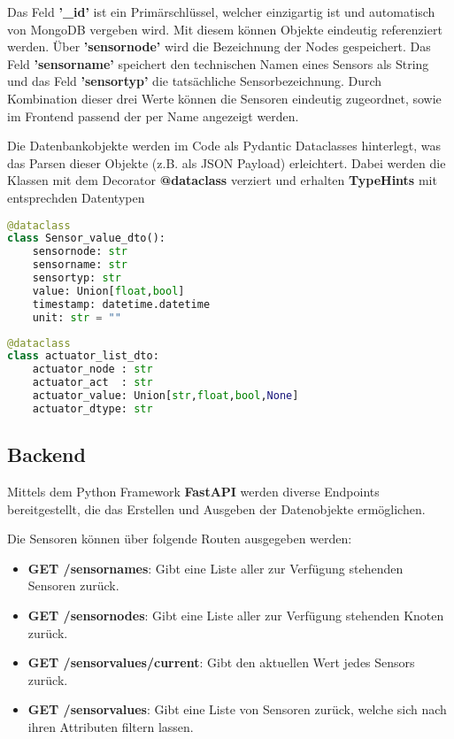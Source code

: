 Das Feld \textbf{'\_id'} ist ein Primärschlüssel, welcher einzigartig ist und automatisch von MongoDB vergeben wird. 
Mit diesem können Objekte eindeutig referenziert werden.
Über \textbf{'sensornode'} wird die Bezeichnung der Nodes gespeichert.
Das Feld \textbf{'sensorname'} speichert den technischen Namen eines Sensors als String und das Feld \textbf{'sensortyp'} die tatsächliche Sensorbezeichnung. 
Durch Kombination dieser drei Werte können die Sensoren eindeutig zugeordnet, sowie im Frontend passend der per Name angezeigt werden.

Die Datenbankobjekte werden im Code als Pydantic Dataclasses hinterlegt, was das Parsen dieser Objekte (z.B. als JSON Payload) erleichtert. 
Dabei werden die Klassen mit dem Decorator \textbf{@dataclass} verziert und erhalten \textbf{TypeHints} mit entsprechden Datentypen

\begin{lstlisting}[language=python,caption={Sensor Dataclass},captionpos=b,showstringspaces=false, basicstyle=\small]
@dataclass
class Sensor_value_dto():
    sensornode: str
    sensorname: str
    sensortyp: str
    value: Union[float,bool]
    timestamp: datetime.datetime
    unit: str = ""
\end{lstlisting}

\begin{lstlisting}[language=python,caption={Actuator Dataclass},captionpos=b,showstringspaces=false, basicstyle=\small]
@dataclass
class actuator_list_dto:
    actuator_node : str
    actuator_act  : str
    actuator_value: Union[str,float,bool,None]
    actuator_dtype: str
\end{lstlisting}

\subsection{Backend}
Mittels dem Python Framework \textbf{FastAPI} werden diverse Endpoints bereitgestellt, die das Erstellen und Ausgeben der Datenobjekte ermöglichen.

Die Sensoren können über folgende Routen ausgegeben werden:
\begin{itemize}
\item \textbf{GET /sensornames}: Gibt eine Liste aller zur Verfügung stehenden Sensoren zurück.
\item \textbf{GET /sensornodes}: Gibt eine Liste aller zur Verfügung stehenden Knoten zurück.
\item \textbf{GET /sensorvalues/current}: Gibt den aktuellen Wert jedes Sensors zurück.
\item \textbf{GET /sensorvalues}: Gibt eine Liste von Sensoren zurück, welche sich nach ihren Attributen filtern lassen.
\end{itemize}

